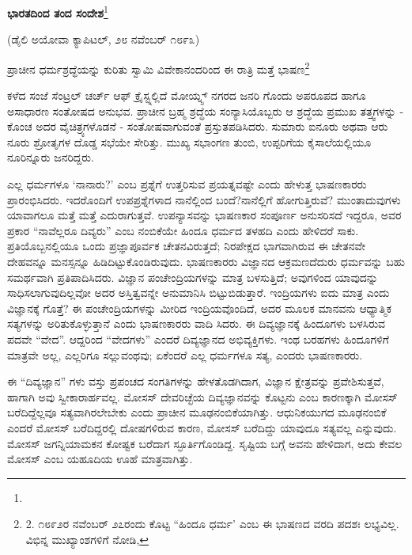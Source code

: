 \begin{center}
\textbf{ಭಾರತದಿಂದ ತಂದ ಸಂದೇಶ}\footnote{}
\end{center}

\begin{center}
(ಡೈಲಿ ಅಯೋವಾ ಕ್ಯಾಪಿಟಲ್, ೨೮ ನವೆಂಬರ್ ೧೮೯೩)
\end{center}

ಪ್ರಾಚೀನ ಧರ್ಮಶ್ರದ್ಧೆಯನ್ನು ಕುರಿತು ಸ್ವಾಮಿ ವಿವೇಕಾನಂದರಿಂದ ಈ ರಾತ್ರಿ ಮತ್ತೆ ಭಾಷಣ\footnote{2. ೧೮೯೨ರ ನವೆಂಬರ್ ೨೭ರಂದು ಕೊಟ್ಟ “ಹಿಂದೂ ಧರ್ಮ’ ಎಂಬ ಈ ಭಾಷಣದ ವರದಿ ಪದಶಃ ಲಭ್ಯವಿಲ್ಲ. ವಿಭಿನ್ನ ಮುಖ್ಯಾಂಶಗಳಿಗೆ ನೋಡಿ, }

ಕಳೆದ ಸಂಜೆ ಸೆಂಟ್ರಲ್ ಚರ್ಚ್ ಆಫ್ ಕ್ರೈಸ್ಟ್ನಲ್ಲಿದೆ ಮೋಯ್ನ್ಸ್ ನಗರದ ಜನರಿ ಗೊಂದು ಅಪರೂಪದ ಹಾಗೂ ಅಸಾಧಾರಣ ಸಂತೋಷದ ಅನುಭವ. ಪ್ರಾಚೀನ ಬ್ರಹ್ಮ ಶ್ರದ್ಧೆಯ ಸಂನ್ಯಾಸಿಯೊಬ್ಬರು ಆ ಶ್ರದ್ಧೆಯ ಪ್ರಮುಖ ತತ್ತ್ವಗಳನ್ನು - ಕೊಂಚ ಅದರ ವೈಚಿತ್ರ್ಯಗಳೊಡನೆ - ಸಂತೋಷವಾಗುವಂತೆ ಪ್ರಸ್ತುತಪಡಿಸಿದರು. ಸುಮಾರು ಐನೂರು ಅಥವಾ ಆರು ನೂರು ಶ್ರೋತೃಗಳ ದೊಡ್ಡ ಸಭೆಯೇ ಸೇರಿತ್ತು. ಮುಖ್ಯ ಸಭಾಂಗಣ ತುಂಬಿ, ಉಪ್ಪರಿಗೆಯ ಕೈಸಾಲೆಯಲ್ಲಿಯೂ ನೂರಿನ್ನೂರು ಜನರಿದ್ದರು.

ಎಲ್ಲ ಧರ್ಮಗಳೂ ‘ನಾನಾರು?’ ಎಂಬ ಪ್ರಶ್ನೆಗೆ ಉತ್ತರಿಸುವ ಪ್ರಯತ್ನವಷ್ಟೇ ಎಂದು ಹೇಳುತ್ತ ಭಾಷಣಕಾರರು ಪ್ರಾರಂಭಿಸಿದರು. ಇದರೊಂದಿಗೆ ಉಪಪ್ರಶ್ನೆಗಳಾದ ನಾನೆಲ್ಲಿಂದ ಬಂದೆ?ನಾನೆಲ್ಲಿಗೆ ಹೋಗುತ್ತಿರುವೆ? ಮುಂತಾದುವುಗಳು ಯಾವಾಗಲೂ ಮತ್ತೆ ಮತ್ತೆ ಎದುರಾಗುತ್ತವೆ. ಉಪನ್ಯಾಸವನ್ನು ಭಾಷಣಕಾರ ಸಂಪೂರ್ಣ ಅನುಸರಿಸದೆ ಇದ್ದರೂ, ಅವರ ಪ್ರಕಾರ “ನಾವೆಲ್ಲರೂ ದಿವ್ಯರು” ಎಂಬ ನಂಬಿಕೆಯೇ ಹಿಂದೂ ಧರ್ಮದ ತಳಹದಿ ಎಂದು ಹೇಳಿದರೆ ಸಾಕು. ಪ್ರತಿಯೊಬ್ಬನಲ್ಲಿಯೂ ಒಂದು ಪ್ರಜ್ಞಾಪೂರ್ವಕ ಚೇತನವಿರುತ್ತದೆ; ನಿರಪೇಕ್ಷದ ಭಾಗವಾಗಿರುವ ಈ ಚೇತನವೇ ದೇಹವನ್ನೂ ಮನಸ್ಸನ್ನೂ ಹಿಡಿದಿಟ್ಟುಕೊಂಡಿರುವುದು. ಭಾಷಣಕಾರರು ವಿಜ್ಞಾನದ ಆಕ್ರಮಣದೆದುರು ಧರ್ಮವನ್ನು ಬಹು ಸಮರ್ಥವಾಗಿ ಪ್ರತಿಪಾದಿಸಿದರು. ವಿಜ್ಞಾನ ಪಂಚೇಂದ್ರಿಯಗಳನ್ನು ಮಾತ್ರ ಬಳಸುತ್ತಿದೆ; ಅವುಗಳಿಂದ ಯಾವುದನ್ನು ಸಾಧಿಸಲಾಗುವುದಿಲ್ಲವೋ ಅದರ ಅಸ್ತಿತ್ವವನ್ನೇ ಅನುಮಾನಿಸಿ ಬಿಟ್ಟುಬಿಡುತ್ತಾರೆ. ಇಂದ್ರಿಯಗಳು ಐದು ಮಾತ್ರ ಎಂದು ವಿಜ್ಞಾನಕ್ಕೆ ಗೊತ್ತೆ? ಈ ಪಂಚೇಂದ್ರಿಯಗಳನ್ನು ಮೀರಿದ ಇಂದ್ರಿಯವೊಂದಿದೆ, ಅದರ ಮೂಲಕ ಮಾನವನು ಆಧ್ಯಾತ್ಮಿಕ ಸತ್ಯಗಳನ್ನು ಅರಿತುಕೊಳ್ಳುತ್ತಾನೆ ಎಂದು ಭಾಷಣಕಾರರು ವಾದಿ ಸಿದರು. ಈ ದಿವ್ಯಜ್ಞಾನಕ್ಕೆ ಹಿಂದೂಗಳು ಬಳಸಿರುವ ಪದವೇ “ವೇದ”. ಆದ್ದರಿಂದ “ವೇದಗಳು” ಎಂದರೆ ದಿವ್ಯಜ್ಞಾನದ ಅಭಿವ್ಯಕ್ತಿಗಳು. ಇಂಥ ಬರಹಗಳು ಹಿಂದೂಗಳಿಗೆ ಮಾತ್ರವೇ ಅಲ್ಲ, ಎಲ್ಲರಿಗೂ ಸಲ್ಲುವಂಥವು; ಏಕೆಂದರೆ ಎಲ್ಲ ಧರ್ಮಗಳೂ ಸತ್ಯ, ಎಂದರು ಭಾಷಣಕಾರರು.

ಈ “ದಿವ್ಯಜ್ಞಾನ” ಗಳು ವಸ್ತು ಪ್ರಪಂಚದ ಸಂಗತಿಗಳನ್ನು ಹೇಳತೊಡಗಿದಾಗ, ವಿಜ್ಞಾನ ಕ್ಷೇತ್ರವನ್ನು ಪ್ರವೇಶಿಸುತ್ತವೆ, ಹಾಗಾಗಿ ಅವು ಸ್ವೀಕಾರಾರ್ಹವಲ್ಲ. ಮೋಸಸ್ ದೇವರಿಚ್ಛೆಯ ದಿವ್ಯಜ್ಞಾನವನ್ನು ಕೊಟ್ಟನು ಎಂಬ ಕಾರಣಕ್ಕಾಗಿ ಮೋಸಸ್ ಬರೆದಿದ್ದೆಲ್ಲವೂ ಸತ್ಯವಾಗಿರಲೇಬೇಕು ಎಂದು ಪ್ರಾಚೀನ ಮೂಢನಂಬಿಕೆಯಾಗಿತ್ತು. ಆಧುನಿಕಯುಗದ ಮೂಢನಂಬಿಕೆ ಎಂದರೆ ಮೋಸಸ್ ಬರೆದಿದ್ದರಲ್ಲಿ ದೋಷಗಳಿರುವ ಕಾರಣ, ಮೋಸಸ್ ಬರೆದಿದ್ದು ಯಾವುದೂ ಸತ್ಯವಲ್ಲ ಎನ್ನುವುದು. ಮೋಸಸ್ ಜಗನ್ನಿಯಾಮಕನ ಕೋಷ್ಟಕ ಬರೆದಾಗ ಸ್ಫೂರ್ತಿಗೊಂಡಿದ್ದ. ಸೃಷ್ಟಿಯ ಬಗ್ಗೆ ಅವನು ಹೇಳಿದಾಗ, ಅದು ಕೇವಲ ಮೋಸಸ್ ಎಂಬ ಯಹೂದಿಯ ಊಹೆ ಮಾತ್ರವಾಗಿತ್ತು.

